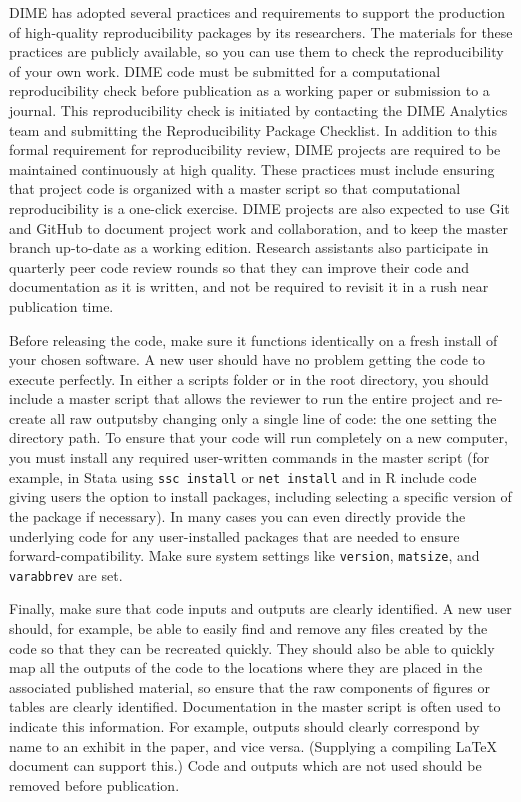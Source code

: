 DIME has adopted several practices and requirements to support the production
of high-quality reproducibility packages by its researchers.
The materials for these practices are publicly available,
so you can use them to check the reproducibility of your own work.
DIME code must be submitted for a computational reproducibility check
before publication as a working paper or submission to a journal.
This reproducibility check is initiated by contacting the DIME Analytics team
and submitting the Reproducibility Package Checklist.
In addition to this formal requirement for reproducibility review,
DIME projects are required to be maintained continuously at high quality.
These practices must include ensuring that project code is organized
with a master script so that computational reproducibility is a one-click exercise.
DIME projects are also expected to use Git and GitHub
to document project work and collaboration,
and to keep the master branch up-to-date as a working edition.
Research assistants also participate in quarterly peer code review rounds
so that they can improve their code and documentation as it is written,
and not be required to revisit it in a rush near publication time.

Before releasing the code, make sure it functions identically on a fresh install of your chosen software.
A new user should have no problem getting the code to execute perfectly.
In either a scripts folder or in the root directory,
you should include a master script that allows the reviewer to run the entire project
and re-create all raw outputsby changing only a single line of code:
the one setting the directory path.
To ensure that your code will run completely on a new computer,
you must install any required user-written commands in the master script
(for example, in Stata using \texttt{ssc install} or \texttt{net install}
and in R include code giving users the option to install packages,
including selecting a specific version of the package if necessary).
In many cases you can even directly provide the underlying code
for any user-installed packages that are needed to ensure forward-compatibility.
Make sure system settings like \texttt{version}, \texttt{matsize}, and \texttt{varabbrev} are set.

Finally, make sure that code inputs and outputs are clearly identified.
A new user should, for example, be able to easily find and remove
any files created by the code so that they can be recreated quickly.
They should also be able to quickly map all the outputs of the code
to the locations where they are placed in the associated published material,
so ensure that the raw components of figures or tables are clearly identified.
Documentation in the master script is often used to indicate this information.
For example, outputs should clearly correspond by name to an exhibit in the paper, and vice versa.
(Supplying a compiling {\LaTeX} document can support this.)
Code and outputs which are not used should be removed before publication.

